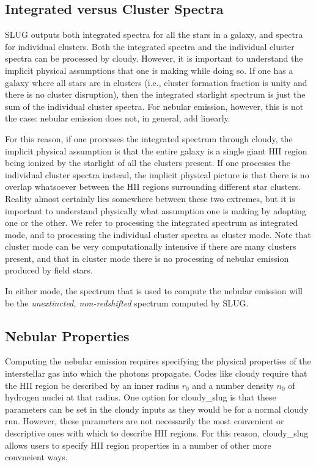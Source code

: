 \documentclass[letterpaper,10pt,english]{sphinxmanual}
\begin{document}
\subsection{Integrated versus Cluster Spectra}
\label{cloudy:sssec-cloudy-integrated-cluster}\label{cloudy:integrated-versus-cluster-spectra}
SLUG outputs both integrated spectra for all the stars in a galaxy,
and spectra for individual clusters. Both the integrated spectra and
the individual cluster spectra can be processed by cloudy. However, it
is important to understand the implicit physical assumptions that one
is making while doing so. If one has a galaxy where all stars are in
clusters (i.e., cluster formation fraction is unity and there is no
cluster disruption), then the integrated starlight spectrum is just
the sum of the individual cluster spectra. For nebular emission,
however, this is not the case: nebular emission does not, in general,
add linearly.

For this reason, if one processes the integrated spectrum through
cloudy, the implicit physical assumption is that the entire galaxy is
a single giant HII region being ionized by the starlight of all the
clusters present. If one processes the individual cluster spectra
instead, the implicit physical picture is that there is no overlap
whatsoever between the HII regions surrounding different star
clusters. Reality almost certainly lies somewhere between these two
extremes, but it is important to understand physically what assumption
one is making by adopting one or the other. We refer to processing the
integrated spectrum as integrated mode, and to processing the
individual cluster spectra as cluster mode. Note that cluster mode can
be very computationally intensive if there are many clusters present,
and that in cluster mode there is no processing of nebular emission
produced by field stars.

In either mode, the spectrum that is used to compute the nebular
emission will be the \emph{unextincted, non-redshifted} spectrum computed
by SLUG.


\subsection{Nebular Properties}
\label{cloudy:nebular-properties}\label{cloudy:sssec-cloudy-nebular-properties}
Computing the nebular emission requires specifying the physical
properties of the interstellar gas into which the
photons propagate. Codes like cloudy require that the HII region be
described by an inner radius \(r_0\) and a number density
\(n_{0}\) of hydrogen nuclei at that radius. One option for
cloudy\_slug is that these parameters can be set in the cloudy inputs
as they would be for a normal cloudy run. However, these parameters
are not necessarily the most convenient or descriptive ones with which
to describe HII regions. For this reason, cloudy\_slug allows users to
specify HII region properties in a number of other more convneient
ways.
\end{document}
